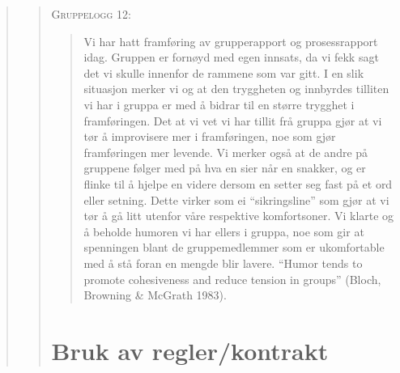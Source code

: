 \begin{quote}
\begin{quote}

\textsc{Gruppelogg 12:}
\begin{quote}
Vi har hatt framføring av grupperapport og prosessrapport idag. Gruppen er fornøyd med egen innsats, da 
vi fekk sagt det vi skulle innenfor de rammene som var gitt. I en slik situasjon merker vi og at den 
tryggheten og innbyrdes tilliten vi har i gruppa er med å bidrar til en større trygghet i framføringen. 
Det at vi vet vi har tillit frå gruppa gjør at vi tør å improvisere mer i framføringen, noe som gjør 
framføringen mer levende. Vi merker også at de andre på gruppene følger med på hva en sier når en snakker, 
og er flinke til å hjelpe en videre dersom en setter seg fast på et ord eller setning. Dette virker som 
ei ``sikringsline'' som gjør at vi tør å gå litt utenfor våre respektive komfortsoner. Vi klarte og å beholde 
humoren vi har ellers i gruppa, noe som gir at spenningen blant de gruppemedlemmer som er ukomfortable 
med å stå foran en mengde blir lavere. ``Humor tends to promote cohesiveness and reduce tension in groups'' 
(Bloch, Browning \& McGrath 1983).
\end{quote}



\section{Bruk av regler/kontrakt}


\end{quote}
\end{quote}
